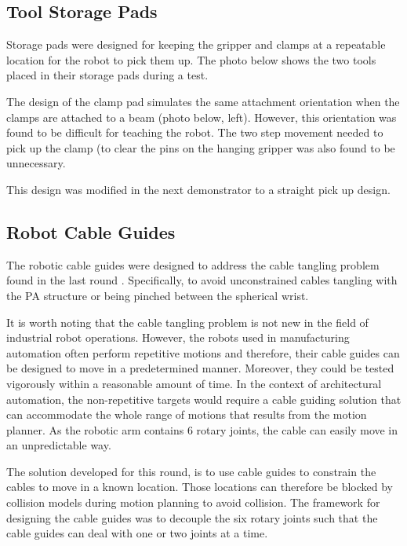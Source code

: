 \subsection{Tool Storage Pads}
\label{subsection:exploration-3-tool-storage-pads}

Storage pads were designed for keeping the gripper and clamps at a repeatable location for the robot to pick them up. The photo below shows the two tools placed in their storage pads during a test. 




The design of the clamp pad simulates the same attachment orientation when the clamps are attached to a beam (photo below, left). However, this orientation was found to be difficult for teaching the robot. The two step movement needed to pick up the clamp (to clear the pins on the hanging gripper was also found to be unnecessary. 



This design was modified in the next demonstrator to a straight pick up design.

\subsection{Robot Cable Guides}
\label{subsection:exploration-3-robot-cable-guides}

The robotic cable guides were designed to address the cable tangling problem found in the last round . Specifically, to avoid unconstrained cables tangling with the PA structure or being pinched between the spherical wrist. 

It is worth noting that the cable tangling problem is not new in the field of industrial robot operations. However, the robots used in manufacturing automation often perform repetitive motions and therefore, their cable guides can be designed to move in a predetermined manner. Moreover, they could be tested vigorously within a reasonable amount of time. In the context of architectural automation, the non-repetitive targets would require a cable guiding solution that can accommodate the whole range of motions that results from the motion planner. As the robotic arm contains 6 rotary joints, the cable can easily move in an unpredictable way.

The solution developed for this round, is to use cable guides to constrain the cables to move in a known location. Those locations can therefore be blocked by collision models during motion planning to avoid collision. The framework for designing the cable guides was to decouple the six rotary joints such that the cable guides can deal with one or two joints at a time. 

